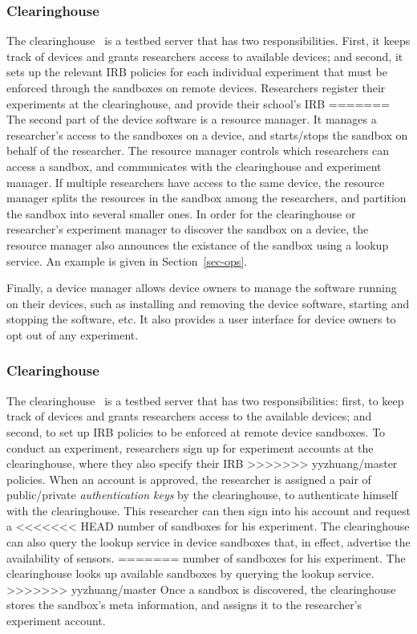 {{\subsubsection{Clearinghouse}\label{sec-ch}
The clearinghouse~\cite{ch} is a testbed server that has two 
responsibilities. First, it keeps track of devices and grants 
researchers access to available devices; and second, it
sets up the relevant IRB policies for each individual experiment that must be enforced through the sandboxes on remote devices.
Researchers register their experiments at the clearinghouse, and provide their school's IRB 
=======
The second part of the device software is a resource manager. It 
manages a researcher's access to the sandboxes on a device, and
starts/stops the sandbox on behalf of the researcher. The 
resource manager controls which researchers 
can access a sandbox, and communicates with the clearinghouse
and experiment manager. If multiple researchers have access to 
the same device, the resource manager splits the resources in 
the sandbox among the researchers, and partition the 
sandbox into several smaller ones. In order for the clearinghouse
or researcher's experiment manager to discover the sandbox on a 
device, the resource manager also announces the existance of the 
sandbox using a lookup service. An example is given in 
Section~\ref{sec-ops}.

Finally, a device manager allows device owners to manage the 
software running on their devices, such as installing and removing 
the device software, starting and stopping the software, etc. It also
provides a user interface for device owners to opt out of any 
experiment.

\subsubsection{Clearinghouse}\label{sec-ch}
The clearinghouse~\cite{ch} is a testbed server that has two 
responsibilities: first, to keep track of devices and grants 
researchers access to the available devices; and second, 
to set up IRB policies to be enforced at remote device sandboxes.
To conduct an experiment, researchers sign up for experiment 
accounts at the clearinghouse, where they also specify their IRB 
>>>>>>> yyzhuang/master
policies. When an account is approved, the researcher is assigned 
a pair of public/private \textit{authentication keys} by the 
clearinghouse, to authenticate himself with the clearinghouse. This
researcher can then sign into his account and request a 
<<<<<<< HEAD
number of sandboxes for his experiment. The clearinghouse can also 
query the lookup service in device sandboxes that, in effect, advertise the availability of sensors.
=======
number of sandboxes for his experiment. The clearinghouse 
looks up available sandboxes by querying the lookup service. 
>>>>>>> yyzhuang/master
Once a sandbox is discovered, the clearinghouse stores the 
sandbox's meta information, 
and assigns it to the researcher's experiment account. 

}}
